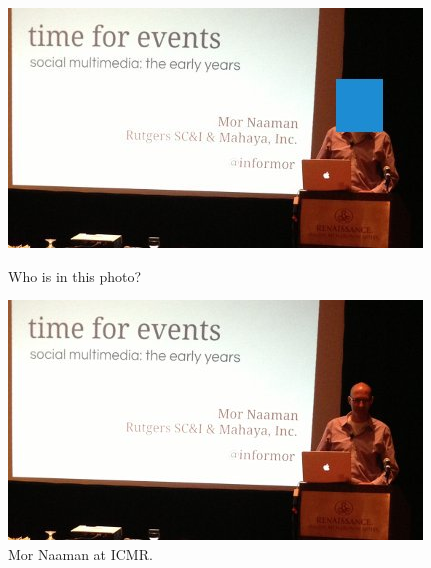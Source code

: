 \begin{figure}[ht]
\begin{minipage}[b]{0.45\linewidth}
\centering
\includegraphics[width=\textwidth]{media/chapter1/icmr-keynote-2-hidden.jpg}
\caption{Who is in this photo?}
\label{fig:example-icmr-hidden}
\end{minipage}
\hspace{0.5cm}
\begin{minipage}[b]{0.45\linewidth}
\centering
\includegraphics[width=\textwidth]{media/chapter1/icmr-keynote-2-show.jpg}
\caption{Mor Naaman at ICMR.}
\label{fig:example-icmr-show}
\end{minipage}
\end{figure}

